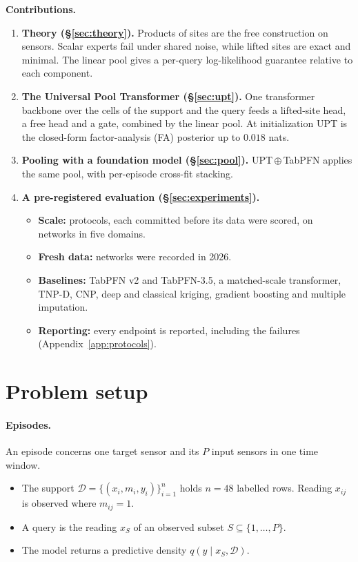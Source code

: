 \documentclass{article}
\newcommand{\D}{\mathcal{D}}
\begin{document}
\textbf{Contributions.}
\begin{enumerate}
  \item \textbf{Theory (\S\ref{sec:theory}).} Products of sites are the free construction on sensors. Scalar
  experts fail under shared noise, while lifted sites are exact and minimal. The linear pool gives a per-query
  log-likelihood guarantee relative to each component.
  \item \textbf{The Universal Pool Transformer (\S\ref{sec:upt}).} One transformer backbone over the cells of the
  support and the query feeds a lifted-site head, a free head and a gate, combined by the linear pool. At
  initialization UPT is the closed-form factor-analysis (FA) posterior up to $0.018$ nats.
  \item \textbf{Pooling with a foundation model (\S\ref{sec:pool}).} UPT\,$\oplus$\,TabPFN applies the same pool,
  with per-episode cross-fit stacking.
  \item \textbf{A pre-registered evaluation (\S\ref{sec:experiments}).}
  \begin{itemize}
    \item \textbf{Scale:} \NumProtocols{} protocols, each committed before its data were scored, on \NumNetworks{}
    networks in five domains.
    \item \textbf{Fresh data:} \NumFreshNetworks{} networks were recorded in 2026.
    \item \textbf{Baselines:} TabPFN v2 and TabPFN-3.5, a matched-scale transformer, TNP-D, CNP, deep and classical kriging,
    gradient boosting and multiple imputation.
    \item \textbf{Reporting:} every endpoint is reported, including the failures (Appendix~\ref{app:protocols}).
  \end{itemize}
\end{enumerate}

\section{Problem setup}
\label{sec:setup}

\paragraph{Episodes.} An episode concerns one target sensor and its $P$ input sensors in one time window.
\begin{itemize}
  \item The support $\D=\{(x_i,m_i,y_i)\}_{i=1}^{n}$ holds $n=48$ labelled rows. Reading $x_{ij}$ is observed where
  $m_{ij}=1$.
  \item A query is the reading $x_S$ of an observed subset $S\subseteq\{1,\dots,P\}$.
  \item The model returns a predictive density $q(y\mid x_S,\D)$.
\end{itemize}
\end{document}
